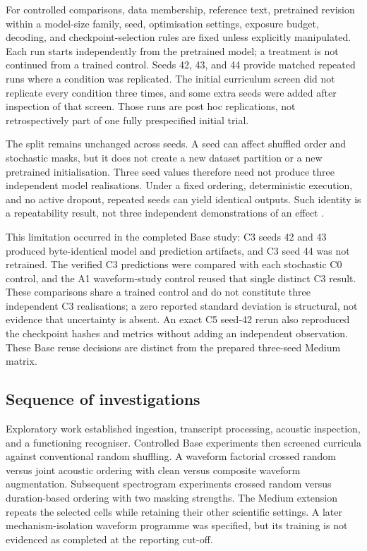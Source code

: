 \documentclass[12pt,a4paper]{report}
\begin{document}
For controlled comparisons, data membership, reference text, pretrained revision within a model-size family, seed, optimisation settings, exposure budget, decoding, and checkpoint-selection rules are fixed unless explicitly manipulated. Each run starts independently from the pretrained model; a treatment is not continued from a trained control. Seeds 42, 43, and 44 provide matched repeated runs where a condition was replicated. The initial curriculum screen did not replicate every condition three times, and some extra seeds were added after inspection of that screen. Those runs are post hoc replications, not retrospectively part of one fully prespecified initial trial.

The split remains unchanged across seeds. A seed can affect shuffled order and stochastic masks, but it does not create a new dataset partition or a new pretrained initialisation. Three seed values therefore need not produce three independent model realisations. Under a fixed ordering, deterministic execution, and no active dropout, repeated seeds can yield identical outputs. Such identity is a repeatability result, not three independent demonstrations of an effect \citep{Reimers2017}.

This limitation occurred in the completed Base study: C3 seeds 42 and 43 produced byte-identical model and prediction artifacts, and C3 seed 44 was not retrained. The verified C3 predictions were compared with each stochastic C0 control, and the A1 waveform-study control reused that single distinct C3 result. These comparisons share a trained control and do not constitute three independent C3 realisations; a zero reported standard deviation is structural, not evidence that uncertainty is absent. An exact C5 seed-42 rerun also reproduced the checkpoint hashes and metrics without adding an independent observation. These Base reuse decisions are distinct from the prepared three-seed Medium matrix.

\subsection{Sequence of investigations}

Exploratory work established ingestion, transcript processing, acoustic inspection, and a functioning recogniser. Controlled Base experiments then screened curricula against conventional random shuffling. A waveform factorial crossed random versus joint acoustic ordering with clean versus composite waveform augmentation. Subsequent spectrogram experiments crossed random versus duration-based ordering with two masking strengths. The Medium extension repeats the selected cells while retaining their other scientific settings. A later mechanism-isolation waveform programme was specified, but its training is not evidenced as completed at the reporting cut-off.
\end{document}
